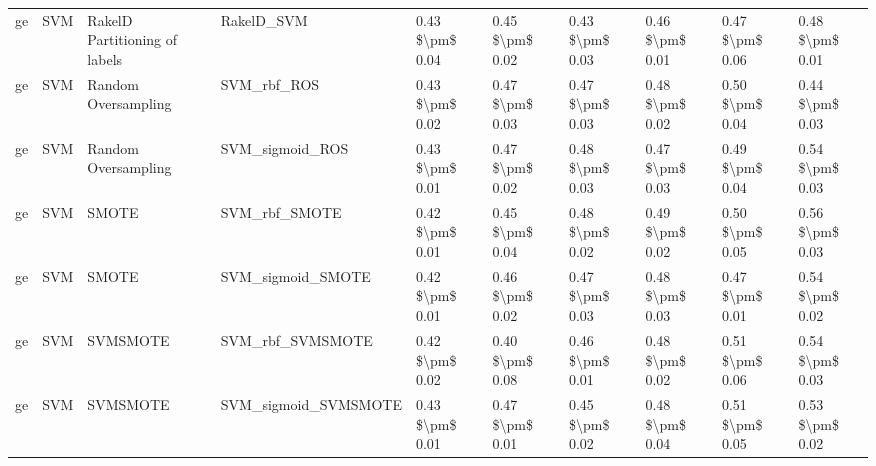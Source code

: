 \begin{tabular}{llllllllll}
      ge &                             SVM & RakelD Partitioning of labels &                                   RakelD\_SVM & 0.43 \$\textbackslash pm\$ 0.04 &           0.45 \$\textbackslash pm\$ 0.02 &       0.43 \$\textbackslash pm\$ 0.03 &        0.46 \$\textbackslash pm\$ 0.01 &                         0.47 \$\textbackslash pm\$ 0.06 &     0.48 \$\textbackslash pm\$ 0.01 \\
      ge &                             SVM &           Random Oversampling &                                  SVM\_rbf\_ROS & 0.43 \$\textbackslash pm\$ 0.02 &           0.47 \$\textbackslash pm\$ 0.03 &       0.47 \$\textbackslash pm\$ 0.03 &        0.48 \$\textbackslash pm\$ 0.02 &                         0.50 \$\textbackslash pm\$ 0.04 &     0.44 \$\textbackslash pm\$ 0.03 \\
      ge &                             SVM &           Random Oversampling &                              SVM\_sigmoid\_ROS & 0.43 \$\textbackslash pm\$ 0.01 &           0.47 \$\textbackslash pm\$ 0.02 &       0.48 \$\textbackslash pm\$ 0.03 &        0.47 \$\textbackslash pm\$ 0.03 &                         0.49 \$\textbackslash pm\$ 0.04 &     0.54 \$\textbackslash pm\$ 0.03 \\
      ge &                             SVM &                         SMOTE &                                SVM\_rbf\_SMOTE & 0.42 \$\textbackslash pm\$ 0.01 &           0.45 \$\textbackslash pm\$ 0.04 &       0.48 \$\textbackslash pm\$ 0.02 &        0.49 \$\textbackslash pm\$ 0.02 &                         0.50 \$\textbackslash pm\$ 0.05 &     0.56 \$\textbackslash pm\$ 0.03 \\
      ge &                             SVM &                         SMOTE &                            SVM\_sigmoid\_SMOTE & 0.42 \$\textbackslash pm\$ 0.01 &           0.46 \$\textbackslash pm\$ 0.02 &       0.47 \$\textbackslash pm\$ 0.03 &        0.48 \$\textbackslash pm\$ 0.03 &                         0.47 \$\textbackslash pm\$ 0.01 &     0.54 \$\textbackslash pm\$ 0.02 \\
      ge &                             SVM &                      SVMSMOTE &                             SVM\_rbf\_SVMSMOTE & 0.42 \$\textbackslash pm\$ 0.02 &           0.40 \$\textbackslash pm\$ 0.08 &       0.46 \$\textbackslash pm\$ 0.01 &        0.48 \$\textbackslash pm\$ 0.02 &                         0.51 \$\textbackslash pm\$ 0.06 &     0.54 \$\textbackslash pm\$ 0.03 \\
      ge &                             SVM &                      SVMSMOTE &                         SVM\_sigmoid\_SVMSMOTE & 0.43 \$\textbackslash pm\$ 0.01 &           0.47 \$\textbackslash pm\$ 0.01 &       0.45 \$\textbackslash pm\$ 0.02 &        0.48 \$\textbackslash pm\$ 0.04 &                         0.51 \$\textbackslash pm\$ 0.05 &     0.53 \$\textbackslash pm\$ 0.02 \\

\end{tabular}
